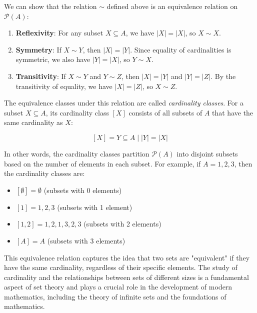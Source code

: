 \begin{solution}
	We can show that the relation $\sim$ defined above is an equivalence relation on $\mathcal{P}(A)$:
	
	\begin{enumerate}
		\item \textbf{Reflexivity}: For any subset $X \subseteq A$, we have $|X| = |X|$, so $X \sim X$.
		\item \textbf{Symmetry}: If $X \sim Y$, then $|X| = |Y|$. Since equality of cardinalities is symmetric, we also have $|Y| = |X|$, so $Y \sim X$.
		\item \textbf{Transitivity}: If $X \sim Y$ and $Y \sim Z$, then $|X| = |Y|$ and $|Y| = |Z|$. By the transitivity of equality, we have $|X| = |Z|$, so $X \sim Z$.
	\end{enumerate}
	The equivalence classes under this relation are called \textit{cardinality classes}. For a subset $X \subseteq A$, its cardinality class $[X]$ consists of all subsets of $A$ that have the same cardinality as $X$:
	
	$$
	[X] = {Y \subseteq A \mid |Y| = |X|}
	$$
	
	In other words, the cardinality classes partition $\mathcal{P}(A)$ into disjoint subsets based on the number of elements in each subset. For example, if $A = {1, 2, 3}$, then the cardinality classes are:
	
	\begin{itemize}
	\item $[\emptyset] = { \emptyset }$ (subsets with 0 elements)
	\item $[{1}] = {{1}, {2}, {3}}$ (subsets with 1 element)
	\item $[{1, 2}] = {{1, 2}, {1, 3}, {2, 3}}$ (subsets with 2 elements)
	\item $[A] = {A}$ (subsets with 3 elements)
	\end{itemize}
	
	This equivalence relation captures the idea that two sets are "equivalent" if they have the same cardinality, regardless of their specific elements. The study of cardinality and the relationships between sets of different sizes is a fundamental aspect of set theory and plays a crucial role in the development of modern mathematics, including the theory of infinite sets and the foundations of mathematics.
\end{solution}

